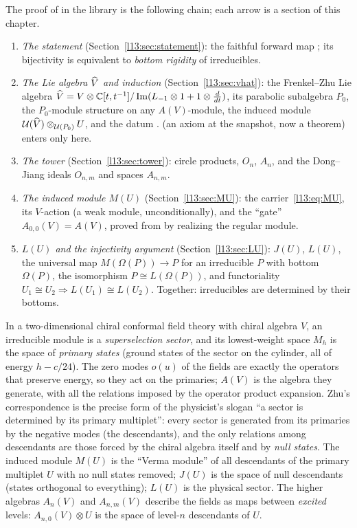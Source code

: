 The proof of  in the library is the following chain; each arrow is a section of this chapter.
\begin{enumerate}
\item \emph{The statement} (Section~\ref{l13:sec:statement}): the faithful forward map ; its
  bijectivity is equivalent to \emph{bottom rigidity} of irreducibles.
\item \emph{The Lie algebra $\widehat{V}$ and induction} (Section~\ref{l13:sec:vhat}): the Frenkel--Zhu Lie algebra
  $\widehat{V} = V\otimes{\mathbb{C}}[t,t^{-1}]/\operatorname{Im}(L_{-1}\otimes1+1\otimes\tfrac{d}{dt})$, its parabolic
  subalgebra $P_0$, the $P_0$-module structure on any $A(V)$-module, the induced module
  $\mathcal{U}(\widehat{V})\otimes_{\mathcal{U}(P_0)}U$, and the datum .  (an axiom at
  the snapshot, now a theorem) enters only here.
\item \emph{The tower} (Section~\ref{l13:sec:tower}): circle products, $O_n$, $A_n$, and the Dong--Jiang ideals
  $O_{n,m}$ and spaces $A_{n,m}$.
\item \emph{The induced module $M(U)$} (Section~\ref{l13:sec:MU}): the carrier~\eqref{l13:eq:MU}, its $V$-action (a weak
  module, unconditionally), and the ``gate'' $A_{0,0}(V) = A(V)$, proved from  by realizing the regular module.
\item \emph{$L(U)$ and the injectivity argument} (Section~\ref{l13:sec:LU}): $J(U)$, $L(U)$, the universal map
  $M(\Omega(P))\to P$ for an irreducible $P$ with bottom $\Omega(P)$, the isomorphism $P\cong L(\Omega(P))$, and
  functoriality $U_1\cong U_2\Rightarrow L(U_1)\cong L(U_2)$. Together: irreducibles are determined by their bottoms.
\end{enumerate}

\begin{physics}
In a two-dimensional chiral conformal field theory with chiral algebra $V$, an irreducible module is a
\emph{superselection sector}, and its lowest-weight space $M_h$ is the space of \emph{primary states} (ground states of
the sector on the cylinder, all of energy $h-c/24$). The zero modes $o(u)$ of the fields are exactly the operators that
preserve energy, so they act on the primaries; $A(V)$ is the algebra they generate, with all the relations imposed by
the operator product expansion. Zhu's correspondence is the precise form of the physicist's slogan ``a sector is
determined by its primary multiplet'': every sector is generated from its primaries by the negative modes (the
descendants), and the only relations among descendants are those forced by the chiral algebra itself and by
\emph{null states}. The induced module $M(U)$ is the ``Verma module'' of all descendants of the primary multiplet $U$
with no null states removed; $J(U)$ is the space of null descendants (states orthogonal to everything); $L(U)$ is the
physical sector. The higher algebras $A_n(V)$ and $A_{n,m}(V)$ describe the fields as maps between \emph{excited}
levels: $A_{n,0}(V)\otimes U$ is the space of level-$n$ descendants of $U$.
\end{physics}

